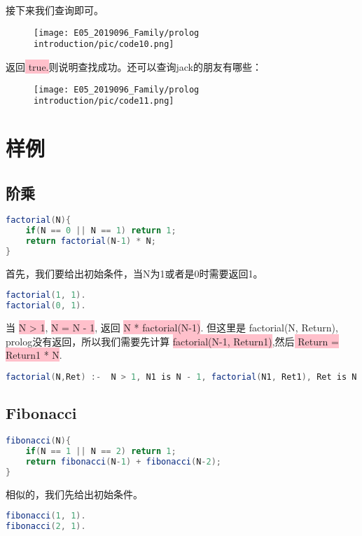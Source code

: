 \documentclass[a4paper, 11pt]{article}
\begin{document}
接下来我们查询即可。
\begin{figure}[H]
\centering
\texttt{[image: E05\_2019096\_Family/prolog introduction/pic/code10.png]}
\end{figure}

返回\colorbox{pink}{\color{black} true.}则说明查找成功。还可以查询jack的朋友有哪些：
\begin{figure}[H]
\centering
\texttt{[image: E05\_2019096\_Family/prolog introduction/pic/code11.png]}
\end{figure}

\section{样例}
\subsection{阶乘}
\begin{lstlisting}[language={java}]
factorial(N){
    if(N == 0 || N == 1) return 1;
    return factorial(N-1) * N;
}
\end{lstlisting}
首先，我们要给出初始条件，当N为1或者是0时需要返回1。

\begin{lstlisting}[language={java}]
factorial(1, 1).
factorial(0, 1).
\end{lstlisting}

当 \colorbox{pink}{\color{black} N > 1}, \colorbox{pink}{\color{black} N = N - 1}, 返回 \colorbox{pink}{\color{black} N * factorial(N-1)}. 但这里是 factorial(N, Return), prolog没有返回，所以我们需要先计算  \colorbox{pink}{\color{black} factorial(N-1, Return1)},然后\colorbox{pink}{\color{black} Return = Return1 * N}.
\begin{lstlisting}[language={java}]
factorial(N,Ret) :-  N > 1, N1 is N - 1, factorial(N1, Ret1), Ret is N * Ret1.
\end{lstlisting}

\subsection{Fibonacci}
\begin{lstlisting}[language={java}]
fibonacci(N){
    if(N == 1 || N == 2) return 1;
    return fibonacci(N-1) + fibonacci(N-2);
}
\end{lstlisting}

相似的，我们先给出初始条件。
\begin{lstlisting}[language={java}]
fibonacci(1, 1).
fibonacci(2, 1).
\end{lstlisting}
\end{document}
